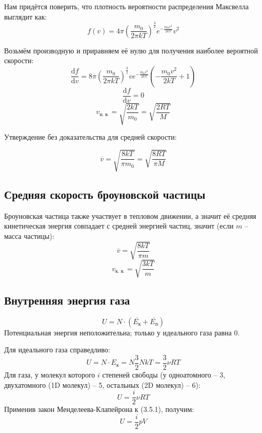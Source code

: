 
Нам придётся поверить, что плотность вероятности распределения Максвелла выглядит как:
\[f(v) = 4\pi(\frac{m_0}{2\pi k T})^{\frac{3}{2}}e^{-\frac{m_0v^2}{2 k T}}v^2\]

Возьмём производную и приравняем её нулю для получения наиболее вероятной скорости:
\[\frac{\text{d}f}{\text{d}v}=8\pi(\frac{m_0}{2\pi k T})^{\frac{3}{2}}ve^{-\frac{m_0v^2}{2 k T}}(-\frac{m_0 v^2}{2kT}+1)\]
\[\frac{\text{d}f}{\text{d}v}=0\]
\[v_{\text{н. в.}}=\sqrt{\frac{2kT}{m_0}}=\sqrt{\frac{2RT}{M}}\]

Утверждение без доказательства для средней скорости:\par
\[\overline{v}=\sqrt{\frac{8kT}{\pi m_0}}=\sqrt{\frac{8RT}{\pi M}}\]



\subsection{Средняя скорость броуновской частицы}
Броуновская частица также участвует в тепловом движении, а значит её средняя кинетическая энергия совпадает с средней энергией частиц, значит (если $m$ -- масса частицы):
\[\overline{v}=\sqrt{\frac{8kT}{\pi m}}\]
\[v_{\text{к. в.}}=\sqrt{\frac{3kT}{m}}\]



\subsection{Внутренняя энергия газа}
\[U=N \cdot (\overline{E_\text{к}}+\overline{E_\text{п}})\]
Потенциальная энергия неположительна; только у идеального газа равна 0.\par

Для идеального газа справедливо:
\[U=N\cdot E_{\text{к}}=N\frac{3}{2}NkT=\frac{3}{2} \nu RT\]
Для газа, у молекул которого $i$ степеней свободы (у одноатомного -- 3, двухатомного (1D молекул) -- 5, остальных (2D молекул) -- 6):
\begin{equation}
U=\frac{i}{2}\nu RT
\end{equation}
Применив закон Менделеева-Клапейрона к (3.5.1), получим:
\begin{equation*}
U=\frac{i}{2}pV
\end{equation*}